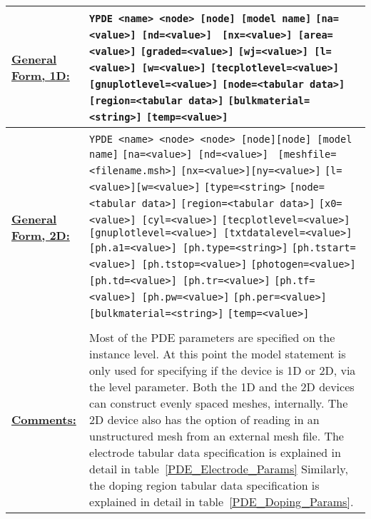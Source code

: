 


\small
\begin{longtable}[Hh]{>{\setlength{\hsize}{.3\hsize}}YY}
\hline

\underline{\bf General Form, 1D:} &
\verb|YPDE <name> <node> [node] [model name]|
\verb|[na=<value>] [nd=<value>] |
\verb|[nx=<value>] [area=<value>]|
\verb|[graded=<value>]|
\verb|[wj=<value>] [l=<value>] [w=<value>]|
\verb|[tecplotlevel=<value>]|
\verb|[gnuplotlevel=<value>]|
\verb|[node=<tabular data>]|
\verb|[region=<tabular data>]|
\verb|[bulkmaterial=<string>]|
\verb|[temp=<value>]|
\\ 
\hline
\\
\hline
\underline{\bf General Form, 2D:} &
\verb|YPDE <name> <node> <node> [node][node] [model name]|
\verb|[na=<value>] [nd=<value>] |
\verb|[meshfile=<filename.msh>]|
\verb|[nx=<value>][ny=<value>]|
\verb|[l=<value>][w=<value>]|
\verb|[type=<string>|
\verb|[node=<tabular data>]|
\verb|[region=<tabular data>]|
\verb|[x0=<value>] [cyl=<value>]|
\verb|[tecplotlevel=<value>]|
\verb|[gnuplotlevel=<value>] [txtdatalevel=<value>]| 
\verb|[ph.a1=<value>] [ph.type=<string>]|
\verb|[ph.tstart=<value>] [ph.tstop=<value>]|
\verb|[photogen=<value>]|
\verb|[ph.td=<value>] [ph.tr=<value>]|
\verb|[ph.tf=<value>] [ph.pw=<value>]|
\verb|[ph.per=<value>]|
\verb|[bulkmaterial=<string>]|
\verb|[temp=<value>]|

\\ \hline
\\
\hline
\underline{\bf Comments:} & Most of the PDE parameters are specified on the
instance level. At this point the model statement is only used for specifying
if the device is 1D or 2D, via the level parameter.  Both the 1D and the 
2D devices can construct evenly spaced meshes, internally. The 2D device also 
has the option of reading in an unstructured mesh from an external mesh file.  
\linebreak \linebreak
The electrode tabular data specification is explained in detail in 
table~\ref {PDE_Electrode_Params} Similarly, the doping region tabular 
data specification is explained in detail in 
table~\ref{PDE_Doping_Params}. \linebreak
\\ \hline
\end{longtable}
\addtocounter{table}{-1}


